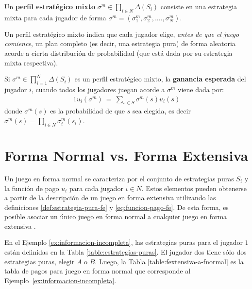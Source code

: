\begin{definition}
Un \textbf{perfil estratégico mixto} $\sigma^m \in \prod_{i \in N} \Delta(S_i)$ consiste en una estrategia mixta para cada jugador de forma $\sigma^m = (\sigma_1^m, \sigma_2^m, ...., \sigma_N^m)$.
\end{definition}

Un perfil estratégico mixto indica que cada jugador elige, \emph{antes de que el juego comience}, un plan completo (es decir, una estrategia pura) de forma aleatoria acorde a cierta distribución de probabilidad (que está dada por su estrategia mixta respectiva).

Si $\sigma^m \in \prod_{i = 1}^N \Delta(S_i)$ es un perfil estratégico mixto, la \textbf{ganancia esperada} del jugador $i$, cuando todos los jugadores juegan acorde a $\sigma^m$ viene dada por:
\begin{alignat}{1}
u_i(\sigma^m)\ =\ \sum_{s \in S} \sigma^m(s)u_i(s)
\end{alignat}
donde $\sigma^m(s)$ es la probabilidad de que $s$ sea elegida, es decir $\sigma^m(s) = \prod_{i \in N} \sigma_i^m(s_i)$.

\section{Forma Normal vs. Forma Extensiva}
\label{section:normal-extensiva}

Un juego en forma normal se caracteriza por el conjunto de estrategias puras $S_i$ y la función de pago $u_i$ para cada jugador $i\in N$. Estos elementos pueden obtenerse a partir de la descripción de un juego en forma extensiva utilizando las definiciones \ref{def:estrategia-pura-fe} y \ref{eq:funcion-pago-fe}. De esta forma, es posible asociar un único juego en forma normal a cualquier juego en forma extensiva \cite[p.~43]{bib:handbook-blai}.

En el Ejemplo \ref{ex:informacion-incompleta}, las estrategias puras para el jugador $1$ están definidas en la Tabla \ref{table:estrategias-puras}. El jugador dos tiene sólo dos estrategias puras, elegir $A$ o $B$. Luego, la Tabla \ref{table:fextensiva-a-fnormal} es la tabla de pagos para juego en forma normal que corresponde al Ejemplo~\ref{ex:informacion-incompleta}.

